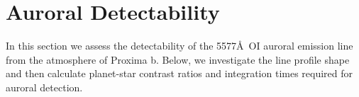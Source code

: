 \documentclass{emulateapj}
\begin{document}
 
 
 
 
  
 
\section{Auroral Detectability}
\label{sec:detect}

In this section we assess the detectability of the 5577\AA\ OI auroral emission line from the atmosphere of Proxima b. Below, we investigate the line profile shape and then calculate planet-star contrast ratios and integration times required for auroral detection.
\end{document}
